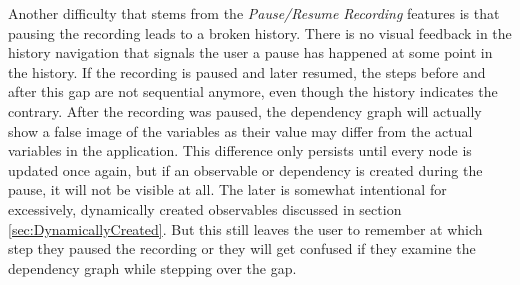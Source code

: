 Another difficulty that stems from the \emph{Pause/Resume Recording} features is that pausing the recording leads to a broken history. There is no visual feedback in the history navigation that signals the user a pause has happened at some point in the history. If the recording is paused and later resumed, the steps before and after this gap are not sequential anymore, even though the history indicates the contrary. After the recording was paused, the dependency graph will actually show a false image of the variables as their value may differ from the actual variables in the application. This difference only persists until every node is updated once again, but if an observable or dependency is created during the pause, it will not be visible at all. The later is somewhat intentional for excessively, dynamically created observables discussed in section \ref{sec:DynamicallyCreated}. But this still leaves the user to remember at which step they paused the recording or they will get confused if they examine the dependency graph while stepping over the gap.
	
